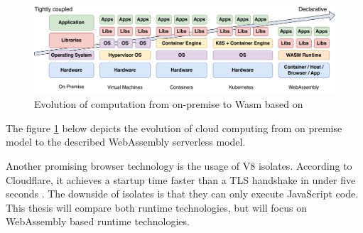 \begin{figure}[H]
	\centering
		\includegraphics[width=\textwidth,height=\textheight,keepaspectratio]{images/introduction/Cloud_Transformation.pdf}
	\caption{Evolution of computation from on-premise to Wasm based on \cite{randall_2021_wasmcloud}}
	\label{fig:cloud-transformation}
\end{figure}

The figure \ref{fig:cloud-transformation} below depicts the evolution of \gls{cloud computing} from on premise model to the described WebAssembly serverless model.

Another promising browser technology is the usage of \gls{V8} \glspl{isolate}. According to Cloudflare, it achieves a startup time faster than a TLS handshake in under five seconds \cite{partovi_2020_eliminating}. The downside of isolates is that they can only execute JavaScript code. This thesis will compare both runtime technologies, but will focus on WebAssembly based runtime technologies.